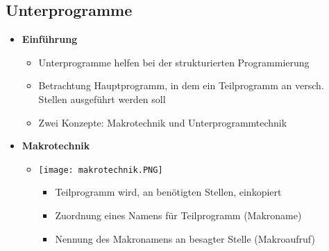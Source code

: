 \pagebreak

\subsection{Unterprogramme}
    \begin{itemize}
        \item \textbf{Einführung}
            \begin{itemize}
                \item Unterprogramme helfen bei der strukturierten Programmierung
                \item Betrachtung Hauptprogramm, in dem ein Teilprogramm an versch. Stellen ausgeführt werden soll
                \item Zwei Konzepte: Makrotechnik und Unterprogrammtechnik
            \end{itemize}

        \item \textbf{Makrotechnik}
            \begin{itemize}
                \item[]
                    \begin{minipage}{0.25\textwidth}
                        \texttt{[image: makrotechnik.PNG]}
                    \end{minipage}
                    \begin{minipage}{0.65\textwidth}
                        \begin{itemize}
                            \item Teilprogramm wird, an benötigten Stellen, einkopiert
                            \item Zuordnung eines Namens für Teilprogramm (Makroname)
                            \item Nennung des Makronamens an besagter Stelle (Makroaufruf)
                        \end{itemize}
                    \end{minipage}
            \end{itemize}


\end{itemize}
